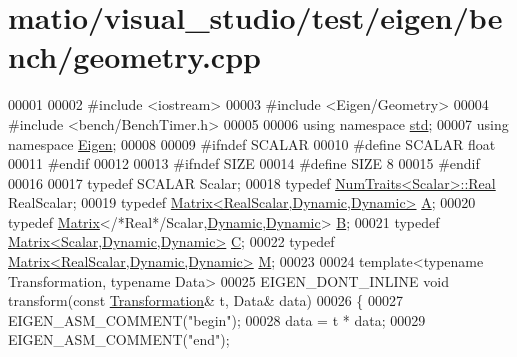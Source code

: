 \hypertarget{matio_2visual__studio_2test_2eigen_2bench_2geometry_8cpp_source}{}\section{matio/visual\+\_\+studio/test/eigen/bench/geometry.cpp}
\label{matio_2visual__studio_2test_2eigen_2bench_2geometry_8cpp_source}

\begin{DoxyCode}
00001 
00002 \textcolor{preprocessor}{#include <iostream>}
00003 \textcolor{preprocessor}{#include <Eigen/Geometry>}
00004 \textcolor{preprocessor}{#include <bench/BenchTimer.h>}
00005 
00006 \textcolor{keyword}{using namespace }\hyperlink{namespacestd}{std};
00007 \textcolor{keyword}{using namespace }\hyperlink{namespace_eigen}{Eigen};
00008 
00009 \textcolor{preprocessor}{#ifndef SCALAR}
00010 \textcolor{preprocessor}{#define SCALAR float}
00011 \textcolor{preprocessor}{#endif}
00012 
00013 \textcolor{preprocessor}{#ifndef SIZE}
00014 \textcolor{preprocessor}{#define SIZE 8}
00015 \textcolor{preprocessor}{#endif}
00016 
00017 \textcolor{keyword}{typedef} SCALAR Scalar;
00018 \textcolor{keyword}{typedef} \hyperlink{group___core___module_struct_eigen_1_1_num_traits}{NumTraits<Scalar>::Real} RealScalar;
00019 \textcolor{keyword}{typedef} \hyperlink{group___core___module_class_eigen_1_1_matrix}{Matrix<RealScalar,Dynamic,Dynamic>} \hyperlink{group___core___module_class_eigen_1_1_matrix}{A};
00020 \textcolor{keyword}{typedef} \hyperlink{group___core___module_class_eigen_1_1_matrix}{Matrix}<\textcolor{comment}{/*Real*/}Scalar,\hyperlink{namespace_eigen_ad81fa7195215a0ce30017dfac309f0b2}{Dynamic},\hyperlink{namespace_eigen_ad81fa7195215a0ce30017dfac309f0b2}{Dynamic}> \hyperlink{group___core___module_class_eigen_1_1_matrix}{B};
00021 \textcolor{keyword}{typedef} \hyperlink{group___core___module}{Matrix<Scalar,Dynamic,Dynamic>} \hyperlink{group___core___module}{C};
00022 \textcolor{keyword}{typedef} \hyperlink{group___core___module_class_eigen_1_1_matrix}{Matrix<RealScalar,Dynamic,Dynamic>} \hyperlink{group___core___module_class_eigen_1_1_matrix}{M};
00023 
00024 \textcolor{keyword}{template}<\textcolor{keyword}{typename} Transformation, \textcolor{keyword}{typename} Data>
00025 EIGEN\_DONT\_INLINE \textcolor{keywordtype}{void} transform(\textcolor{keyword}{const} \hyperlink{class_transformation}{Transformation}& t, Data& data)
00026 \{
00027   EIGEN\_ASM\_COMMENT(\textcolor{stringliteral}{"begin"});
00028   data = t * data;
00029   EIGEN\_ASM\_COMMENT(\textcolor{stringliteral}{"end"});

\end{DoxyCode}
